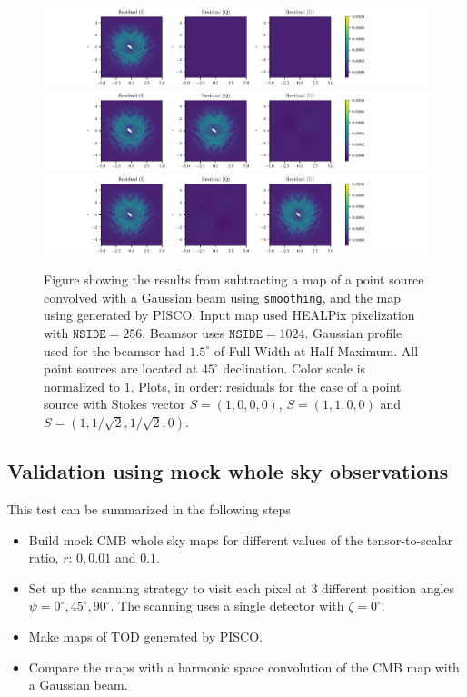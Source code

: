\documentclass[a4paper,fleqn]{cas-dc}\sloppy
\begin{document}
\begin{figure}
	\centering
	\includegraphics[width=1.0\linewidth]{figures/stokes_I_source_256_beam_1024_dec_45.pdf}
	\includegraphics[width=1.0\linewidth]{figures/stokes_Q_source_256_beam_1024_dec_45.pdf}
	\includegraphics[width=1.0\linewidth]{figures/stokes_U_source_256_beam_1024_dec_45.pdf}
	\caption{Figure showing the results from subtracting a map of a point source convolved with a Gaussian beam using \texttt{smoothing}, and the map using generated by PISCO. Input map used HEALPix pixelization with $\mathrm{\texttt{NSIDE}} = 256$. Beamsor uses $\mathrm{\texttt{NSIDE}} = 1024$. Gaussian profile used for the beamsor had $1.5^\circ$ of Full Width at Half Maximum. All point sources are located at $45^\circ$ declination. Color scale is normalized to $1$. Plots, in order: residuals for the case of a point source with Stokes vector $S = (1,0,0,0)$, $S=(1,1,0,0)$ and $S=(1,1/\sqrt{2},1/\sqrt{2},0)$. }
	\label{fig::stokesqsource256beam1024dec45}
\end{figure}

\subsection{Validation using mock whole sky observations}
\label{sec::val_sky}
This test can be summarized in the following steps

\begin{itemize}
	\item Build mock CMB whole sky maps for different values of the tensor-to-scalar ratio, $r$: $0, 0.01$ and $0.1$.
	\item Set up the scanning strategy to visit each pixel at 3 different position angles $\psi = 0^{\circ},45^{\circ},90^{\circ}$. The scanning uses a single detector with $\zeta=0^\circ$.
	\item Make maps of TOD generated by PISCO. 
	\item Compare the maps with a harmonic space convolution of the CMB map with a Gaussian beam.
\end{itemize}
\end{document}
